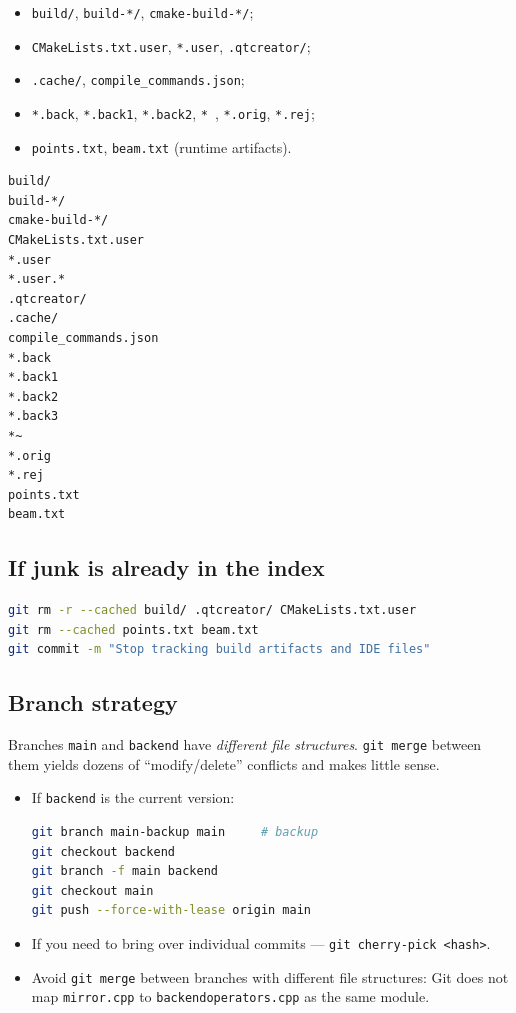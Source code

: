 \documentclass[a4paper,11pt]{article}
\newcommand{\file}[1]{\texttt{#1}}
\newcommand{\code}[1]{\texttt{#1}}
\begin{document}
\begin{itemize}[leftmargin=*]
    \item \file{build/}, \file{build-*/}, \file{cmake-build-*/};
    \item \file{CMakeLists.txt.user}, \file{*.user}, \file{.qtcreator/};
    \item \file{.cache/}, \file{compile\_commands.json};
    \item \file{*.back}, \file{*.back1}, \file{*.back2}, \file{*~},
          \file{*.orig}, \file{*.rej};
    \item \file{points.txt}, \file{beam.txt} (runtime artifacts).
\end{itemize}

\begin{lstlisting}[language=bash,caption={.gitignore}]
build/
build-*/
cmake-build-*/
CMakeLists.txt.user
*.user
*.user.*
.qtcreator/
.cache/
compile_commands.json
*.back
*.back1
*.back2
*.back3
*~
*.orig
*.rej
points.txt
beam.txt
\end{lstlisting}

\subsection{If junk is already in the index}

\begin{lstlisting}[language=bash]
git rm -r --cached build/ .qtcreator/ CMakeLists.txt.user
git rm --cached points.txt beam.txt
git commit -m "Stop tracking build artifacts and IDE files"
\end{lstlisting}

\subsection{Branch strategy}

Branches \code{main} and \code{backend} have \emph{different file
structures}. \code{git merge} between them yields dozens of
``modify/delete'' conflicts and makes little sense.

\begin{itemize}[leftmargin=*]
    \item If \code{backend} is the current version:
\begin{lstlisting}[language=bash]
git branch main-backup main     # backup
git checkout backend
git branch -f main backend
git checkout main
git push --force-with-lease origin main
\end{lstlisting}
    \item If you need to bring over individual commits —
          \code{git cherry-pick <hash>}.
    \item Avoid \code{git merge} between branches with different file
          structures: Git does not map \file{mirror.cpp} to
          \file{backendoperators.cpp} as the same module.
\end{itemize}
\end{document}

